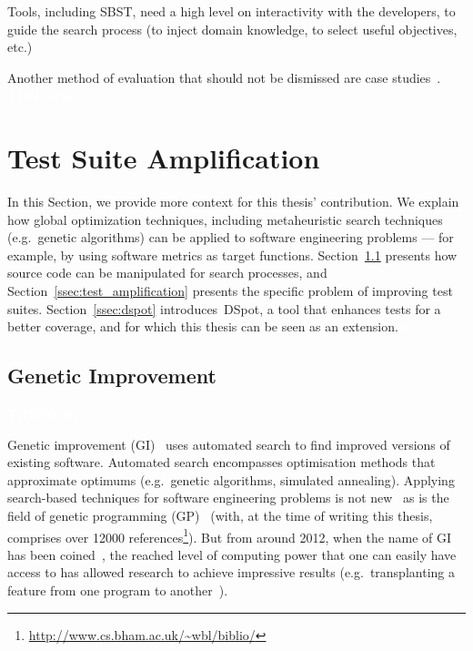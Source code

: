 \documentclass[a4paper,11pt]{sdm_internship}
\newcommand{\todo}[1]{\colorbox{Red!75}{\textcolor{white}{\textbf{TODO\ifx&#1&\else: #1\fi}}}}
\newcommand{\rephrase}[1]{\colorbox{BlueViolet!60}{\textcolor{white}{\textbf{$\sim$#1}}}}
\newcommand{\dspot}{DSpot\xspace}
\theoremstyle{definition}
\begin{document}
Tools, including SBST, need a high level on interactivity with the developers, to guide the search process (to inject domain knowledge, to select useful objectives, etc.)~\cite{marculescu2017transferring}

Another method of evaluation that should not be dismissed are case studies~\cite{flyvbjerg2006five}.
\todo{}


\section{Test Suite Amplification}%
\label{sec:test_suite_amplification}
In this Section, we provide more context for this thesis' contribution.
We explain how global optimization techniques, including metaheuristic search techniques (e.g.\ genetic algorithms) can be applied to software engineering problems --- for example, by using software metrics as target functions.
Section~\ref{ssec:genetic_improvement} presents how source code can be manipulated for search processes, and Section~\ref{ssec:test_amplification} presents the specific problem of improving test suites.
Section~\ref{ssec:dspot} introduces~\dspot{}, a tool that enhances tests for a better coverage, and for which this thesis can be seen as an extension.\rephrase{}

\subsection{Genetic Improvement}%
\label{ssec:genetic_improvement}
\todo{}

Genetic improvement (GI)~\cite{petke2017genetic} uses automated search to find improved versions of existing software.
Automated search encompasses optimisation methods that approximate optimums (e.g.\ genetic algorithms, simulated annealing).
Applying search-based techniques for software engineering problems is not new~\cite{mcminn2011search} as is the field of genetic programming (GP)~\cite{koza1994genetic} (with, at the time of writing this thesis, comprises over 12000 references\footnote{\url{http://www.cs.bham.ac.uk/~wbl/biblio/}}).
But from around 2012, when the name of GI has been coined~\cite{harman2012gismoe}, the reached level of computing power that one can easily have access to has allowed research to achieve impressive results (e.g.\ transplanting a feature from one program to another~\cite{barr2015automated}).
\end{document}
